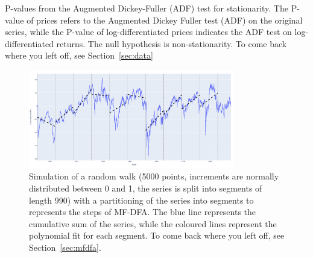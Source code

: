 \documentclass[11pt]{extarticle}
\begin{document}
\begin{table}[h!]
    \centering
    \caption{P-values from the Augmented Dickey-Fuller (ADF) test for stationarity. The P-value of prices refers to the Augmented Dickey Fuller test (ADF) on the original series,
     while the P-value of log-differentiated prices indicates the ADF test on log-differentiated returns. The null hypothesis is non-stationarity.
    To come back where you left off, see Section~\ref{sec:data}}
    \label{table:adf_results}
\end{table}


\begin{figure}[ht]
    \centering
    \includegraphics[width=0.8\textwidth]{img/cumulative_profile_segment_partitioning.png}
    \caption{Simulation of a random walk (5000 points, increments are normally distributed between 0 and 1, the series is
    split into segments of length 990) with a
    partitioning of the series into segments to represents the steps of MF-DFA.
        The blue line represents the cumulative sum of the series, while the coloured lines represent the polynomial fit for
    each segment. To come back where you left off, see Section~\ref{sec:mfdfa}.}
    \label{fig:cumulative_profile_segment_partitioning}
\end{figure}
\FloatBarrier
\end{document}
